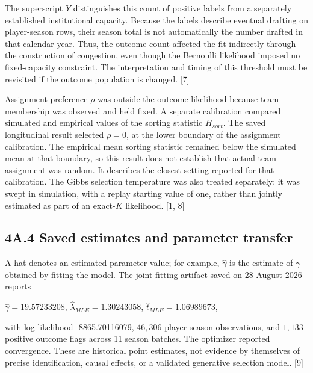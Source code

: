 The superscript \(Y\) distinguishes this count of positive labels from a separately established institutional capacity. Because the labels describe eventual drafting on player-season rows, their season total is not automatically the number drafted in that calendar year. Thus, the outcome count affected the fit indirectly through the construction of congestion, even though the Bernoulli likelihood imposed no fixed-capacity constraint. The interpretation and timing of this threshold must be revisited if the outcome population is changed. {[}7{]}

Assignment preference \(\rho\) was outside the outcome likelihood because team membership was observed and held fixed. A separate calibration compared simulated and empirical values of the sorting statistic \(H_{sort}\). The saved longitudinal result selected \(\rho = 0\), at the lower boundary of the assignment calibration. The empirical mean sorting statistic remained below the simulated mean at that boundary, so this result does not establish that actual team assignment was random. It describes the closest setting reported for that calibration. The Gibbs selection temperature was also treated separately: it was swept in simulation, with a replay starting value of one, rather than jointly estimated as part of an exact-\(K\) likelihood. {[}1, 8{]}

\subsection*{4A.4 Saved estimates and parameter transfer}\label{a.4-saved-estimates-and-parameter-transfer}

A hat denotes an estimated parameter value; for example, \(\widehat{\gamma}\) is the estimate of \(\gamma\) obtained by fitting the model. The joint fitting artifact saved on 28 August 2026 reports

\(\widehat{\gamma} = 19.57233208\), \(\widehat{\lambda}_{MLE} = 1.30243058\), \(\widehat{t}_{MLE} = 1.06989673\),

with log-likelihood -8865.70116079, \(46,306\) player-season observations, and \(1,133\) positive outcome flags across 11 season batches. The optimizer reported convergence. These are historical point estimates, not evidence by themselves of precise identification, causal effects, or a validated generative selection model. {[}9{]}


